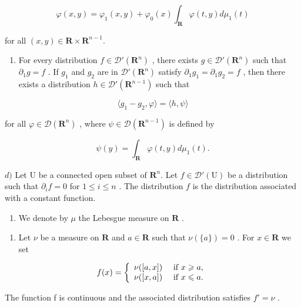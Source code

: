 \[
\varphi (x, y) = \varphi_ {1} (x, y) + \varphi_ {0} (x) \int_ {\mathbf {R}} \varphi (t, y) d \mu_ {1} (t)
\]

for all \((x,y)\in \mathbf{R}\times \mathbf{R}^{n - 1}\).

\begin{enumerate}
\def\labelenumi{\alph{enumi})}
\setcounter{enumi}{2}
\tightlist
\item
  For every distribution \(f \in \mathcal{D}'(\mathbf{R}^{n})\) , there exists \(g \in \mathcal{D}'(\mathbf{R}^{n})\) such that \(\partial_{1}g = f\) . If \(g_{1}\) and \(g_{2}\) are in \(\mathcal{D}'(\mathbf{R}^{n})\) satisfy \(\partial_{1}g_{1} = \partial_{1}g_{2} = f\) , then there exists a distribution \(h \in \mathcal{D}'(\mathbf{R}^{n-1})\) such that
\end{enumerate}

\[
\langle g _ {1} - g _ {2}, \varphi \rangle = \langle h, \psi \rangle
\]

for all \(\varphi\in\mathcal{D}(\mathbf{R}^{n})\) , where \(\psi\in\mathcal{D}(\mathbf{R}^{n-1})\) is defined by

\[
\psi (y) = \int_ {\mathbf {R}} \varphi (t, y) d \mu_ {1} (t).
\]

\(d)\) Let U be a connected open subset of \(\mathbf{R}^{n}\). Let \(f \in \mathcal{D}'(\mathrm{U})\) be a distribution such that \(\partial_{i}f = 0\) for \(1 \leqslant i \leqslant n\) . The distribution \(f\) is the distribution associated with a constant function.

\begin{enumerate}
\def\labelenumi{\arabic{enumi})}
\setcounter{enumi}{3}
\tightlist
\item
  We denote by \(\mu\) the Lebesgue measure on \(\mathbf{R}\) .
\end{enumerate}

\begin{enumerate}
\def\labelenumi{\alph{enumi})}
\tightlist
\item
  Let \(\nu\) be a measure on \(\mathbf{R}\) and \(a \in \mathbf{R}\) such that \(\nu(\{a\}) = 0\) . For \(x \in \mathbf{R}\) we set
\end{enumerate}

\[
f (x) = \left\{ \begin{array}{l l} \nu ([ a, x ]) & \text { if } x \geqslant a, \\ \nu ([ x, a ]) & \text { if } x \leqslant a. \end{array} \right.
\]

The function f is continuous and the associated distribution satisfies \(f' = \nu\) .

